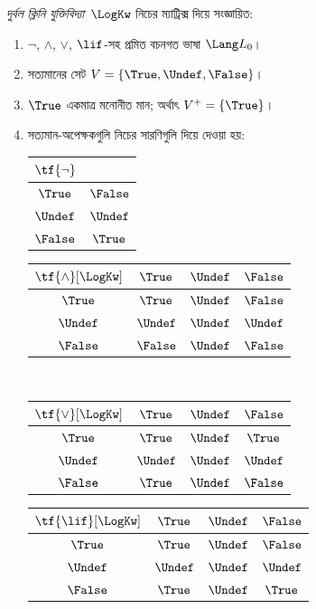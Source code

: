 \documentclass[../../../include/open-logic-section]{subfiles}
\begin{document}
\begin{defn}
\emph{দুর্বল ক্লিনি যুক্তিবিদ্যা}~$\LogKw$ নিচের ম্যাট্রিক্স দিয়ে
সংজ্ঞায়িত:
\begin{enumerate}
  \item $\lnot$, $\land$, $\lor$, $\lif$-সহ প্রমিত বচনগত ভাষা
  $\Lang L_0$।
  \item সত্যমানের সেট $V = \{\True, \Undef, \False\}$।
  \item $\True$ একমাত্র মনোনীত মান; অর্থাৎ $V^+ = \{\True\}$।
  \item সত্যমান-অপেক্ষকগুলি নিচের সারণিগুলি দিয়ে দেওয়া হয়:
  \begin{center}
    \begin{tabular}{c|c}
      $\tf{\lnot}$ & \\
      \hline
      $\True$ & $\False$ \\
      $\Undef$ & $\Undef$ \\
      $\False$ & $\True$
    \end{tabular}
    \quad
    \begin{tabular}{c|ccc}
      $\tf{\land}[\LogKw]$ & $\True$ & $\Undef$ & $\False$ \\
      \hline
      $\True$ & $\True$ & $\Undef$ & $\False$ \\
      $\Undef$ & $\Undef$ & $\Undef$ & $\Undef$\\
      $\False$ & $\False$ & $\Undef$ & $\False$
    \end{tabular}
    \\[2ex]
    \begin{tabular}{c|ccc}
      $\tf{\lor}[\LogKw]$ & $\True$ & $\Undef$ & $\False$ \\
      \hline
      $\True$ & $\True$ & $\Undef$ & $\True$ \\
      $\Undef$ & $\Undef$ & $\Undef$ & $\Undef$ \\
      $\False$ & $\True$ & $\Undef$ & $\False$
    \end{tabular}
    \quad
    \begin{tabular}{c|ccc}
      $\tf{\lif}[\LogKw]$ & $\True$ & $\Undef$ & $\False$ \\
      \hline
      $\True$ & $\True$ & $\Undef$ & $\False$ \\
      $\Undef$ & $\Undef$ & $\Undef$ & $\Undef$  \\
      $\False$ & $\True$ & $\Undef$ & $\True$
    \end{tabular}
  \end{center}
\end{enumerate}
\end{defn}
\end{document}
